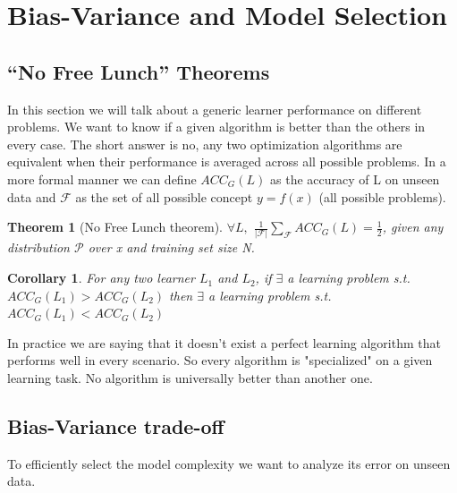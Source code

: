 \documentclass[main.tex]{subfiles}
\newtheorem{theorem}{Theorem}[section] %
\newtheorem{corollary}{Corollary}[theorem]
\begin{document}
\section{Bias-Variance and Model Selection}
\subsection{“No Free Lunch” Theorems}
In this section we will talk about a generic learner performance on different problems. We want to know if a given algorithm is better than the others in every case. The short answer is no, any two optimization algorithms are equivalent when their performance is averaged across all possible problems. In a more formal manner we can define $ACC_G(L)$ as the accuracy of L on unseen data and $\mathcal{F}$ as the set of all possible concept $y=f(x)$ (all possible problems).
\begin{theorem}[No Free Lunch theorem]
$\forall L,$ $\frac{1}{|\mathcal{F}|} \sum_{\mathcal{F}} ACC_G(L) = \frac{1}{2}$, given any distribution $\mathcal{P}$ over x and training set size N.
\end{theorem}
\begin{corollary}
For any two learner $L_1$ and $L_2$, if $\exists$ a learning problem s.t. $ACC_G(L_1)>ACC_G(L_2)$ then $\exists$ a learning problem s.t. $ACC_G(L_1)<ACC_G(L_2)$
\end{corollary}
In practice we are saying that it doesn't exist a perfect learning algorithm that performs well in every scenario. So every algorithm is "specialized" on a given learning task. No algorithm is universally better than another one.

\subsection{Bias-Variance trade-off}
To efficiently select the model complexity we want to analyze its error on unseen data.
\end{document}
